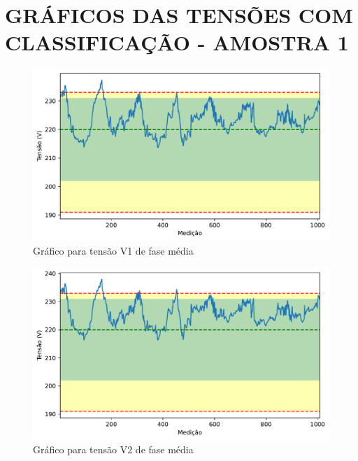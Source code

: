\chapter{GRÁFICOS DAS TENSÕES COM CLASSIFICAÇÃO - AMOSTRA 1}
\label{ap:graficos_a1}


\begin{figure}[H]
	\centering
	\caption{Gráfico para tensão V1 de fase média}
    \includegraphics[width=16cm]{illustrations/figures/a1_V1_Avg.pdf}
\end{figure}

\begin{figure}[H]
	\centering
	\caption{Gráfico para tensão V2 de fase média}
    \includegraphics[width=16cm]{illustrations/figures/a1_V2_Avg.pdf}
\end{figure}

